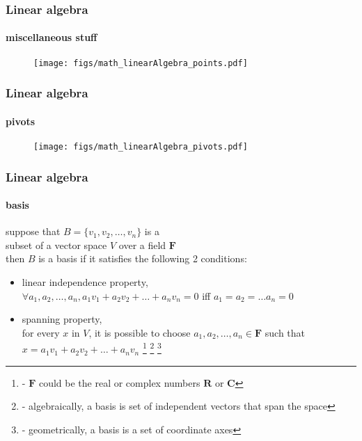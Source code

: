 \begin{frame}
\frametitle{Linear algebra}
\framesubtitle{miscellaneous stuff}
\logoCSIPCPL\mypagenum\mypagenum
	\begin{figure}				
		\texttt{[image: figs/math\_linearAlgebra\_points.pdf]}
	\end{figure}
\end{frame}




\begin{frame}
\frametitle{Linear algebra}
\framesubtitle{pivots}
\logoCSIPCPL\mypagenum\mypagenum
	\begin{figure}				
		\texttt{[image: figs/math\_linearAlgebra\_pivots.pdf]}
	\end{figure}
\end{frame}

\begin{frame}
\frametitle{Linear algebra}
\framesubtitle{basis}
\logoCSIPCPL\mypagenum\mypagenum
suppose that $B=\{v_1, v_2, \ldots, v_n\}$ is a \\
{\color{darkgreen} subset of a vector space $V$ over a field $\mathbf{F}$} \\
\vspace{0.3in}
then $B$ is a basis if it satisfies the following 2 conditions:
	\begin{itemize} 
		\item {\small {\color{blue} linear independence property}, \\ 
 $\forall a_1, a_2, \ldots, a_n, a_1v_1 + a_2v_2 + \ldots + a_nv_n = 0$ iff $a_1=a_2=\ldots a_n=0$}
		\item {\small {\color{blue} spanning property}, \\
 for every $x$ in $V$, it is possible to choose $a_1, a_2, \ldots, a_n \in \mathbf{F}$ such that $x = a_1v_1 + a_2v_2 + \ldots + a_nv_n$}
\footnote{\tiny - $\mathbf{F}$ could be the real or complex numbers $\mathbf{R}$ or $\mathbf{C}$}
\footnote{\tiny - algebraically, a basis is set of independent vectors that span the space}
\footnote{\tiny - geometrically, a basis is a set of coordinate axes}
	\end{itemize}
\end{frame}




